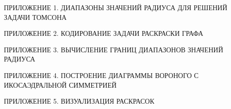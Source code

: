 \begin{description}
\item{ПРИЛОЖЕНИЕ 1. ДИАПАЗОНЫ ЗНАЧЕНИЙ РАДИУСА ДЛЯ РЕШЕНИЙ ЗАДАЧИ ТОМСОНА} \dotfill \pageref{attachments:1}
\item{ПРИЛОЖЕНИЕ 2. КОДИРОВАНИЕ ЗАДАЧИ РАСКРАСКИ ГРАФА} \dotfill \pageref{attachments:2}
\item{ПРИЛОЖЕНИЕ 3. ВЫЧИСЛЕНИЕ ГРАНИЦ ДИАПАЗОНОВ ЗНАЧЕНИЙ РАДИУСА} \dotfill \pageref{attachments:3}
\item{ПРИЛОЖЕНИЕ 4. ПОСТРОЕНИЕ ДИАГРАММЫ ВОРОНОГО С ИКОСАЭДРАЛЬНОЙ СИММЕТРИЕЙ} \dotfill \pageref{attachments:4}
\item{ПРИЛОЖЕНИЕ 5. ВИЗУАЛИЗАЦИЯ РАСКРАСОК} \dotfill \pageref{attachments:5}

\end{description}
